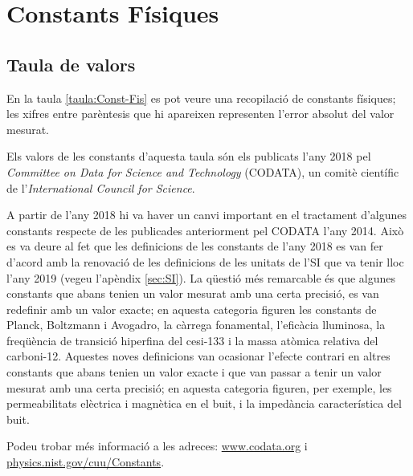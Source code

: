 \chapter{Constants Físiques}\label{sec:const_fis} 

\section{Taula de valors}

En la taula \vref{taula:Const-Fis} es pot veure una recopilació de
constants físiques; les xifres entre parèntesis que hi apareixen representen l'error absolut del valor mesurat.

Els valors de les constants d'aquesta taula són els publicats
l'any 2018 pel \textit{Committee on Data for Science and Technology}
(CODATA), un comitè científic de l'\textit{International Council
for Science}.

A partir de l'any 2018 hi va haver un canvi important en el tractament d'algunes constants respecte de les publicades anteriorment pel CODATA l'any 2014. Això es va deure al fet que les definicions de les constants de l'any 2018 es van fer d'acord amb la renovació de les definicions de les unitats de l'SI que va tenir lloc l'any 2019 (vegeu l'apèndix \ref{sec:SI}). La qüestió més remarcable és que algunes constants que abans tenien un valor mesurat amb una certa precisió, es van redefinir amb un valor exacte; en aquesta categoria figuren les constants de Planck, Boltzmann i Avogadro, la càrrega fonamental, l'eficàcia lluminosa, la freqüència de transició hiperfina del cesi-133 i la massa atòmica relativa del carboni-12. Aquestes noves definicions van ocasionar l'efecte contrari en altres constants que abans tenien un valor exacte i que van passar a tenir un valor mesurat amb una certa precisió; en aquesta categoria figuren, per exemple, les permeabilitats elèctrica i magnètica en el buit, i la impedància característica del buit.

Podeu trobar  més informació a
les adreces: \href{http://www.codata.org/}{www.codata.org} i \href{http://physics.nist.gov/cuu/Constants/}{physics.nist.gov/cuu/Constants}.

